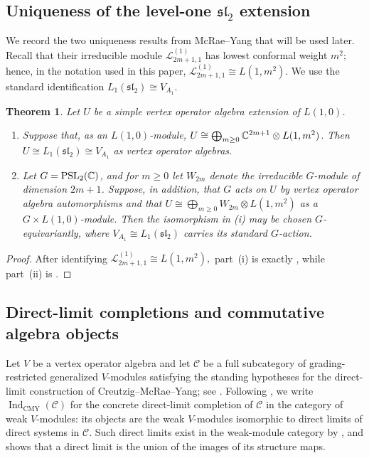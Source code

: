 \documentclass[10pt,a4paper]{amsart}
\numberwithin{equation}{section} \newtheorem{thm}{Theorem}[section] \newtheorem{lem}[thm]{Lemma} \newtheorem{ex}[thm]{Example} \newtheorem{prop}[thm]{Proposition} \newtheorem{cor}[thm]{Corollary} \newtheorem{defi}[thm]{Definition} \newtheorem{rmk}[thm]{Remark} \newtheorem{notation}[thm]{Notation}
\newcommand{\IndCMY}{\operatorname{Ind}_{\mathrm{CMY}}}
\newcommand{\PSLtwo}{\operatorname{PSL}_2(\C)}
\begin{document}
\subsection{Uniqueness of the level-one \texorpdfstring{$\mathfrak{sl}_2$}{sl2} extension}
\label{subsec:MY-L1-uniqueness}

We record the two uniqueness results from McRae--Yang \cite[Appendix~B]{MY} that will be used later. Recall that their irreducible module \(\mathcal L^{(1)}_{2m+1,1}\) has lowest conformal weight \(m^2\); hence, in the notation used in this paper, \(\mathcal L^{(1)}_{2m+1,1}\cong L(1,m^2).\) We use the standard identification \(L_1(\mathfrak{sl}_2)\cong V_{A_1}.\)
\begin{thm}
\label{thm:MY-L1-uniqueness}
Let \(U\) be a simple vertex operator algebra extension of \(L(1,0)\).
\begin{enumerate}[label=\textnormal{(\roman*)}]
\item
Suppose that, as an \(L(1,0)\)-module, \(U\cong\bigoplus_{m\ge0}\mathbb{C}^{2m+1}\otimes L(1,m^2)\). Then \(U\cong L_1(\mathfrak{sl}_2)\cong V_{A_1}\) as vertex operator algebras.

\item
Let \(G=\PSLtwo\), and for \(m\ge0\) let \(W_{2m}\) denote the irreducible \(G\)-module of dimension \(2m+1\). Suppose, in addition, that \(G\) acts on \(U\) by vertex operator algebra automorphisms and that \(U\cong\bigoplus_{m\ge0}W_{2m}\otimes L(1,m^2)\) as a \(G\times L(1,0)\)-module. Then the isomorphism in \textnormal{(i)} may be chosen \(G\)-equivariantly, where \(V_{A_1}\cong L_1(\mathfrak{sl}_2)\) carries its standard \(G\)-action.
\end{enumerate}
\end{thm}

\begin{proof}
After identifying \(\mathcal L^{(1)}_{2m+1,1}\cong L(1,m^2),\) part~\textnormal{(i)} is exactly \cite[Theorem~B.1]{MY}, while part~\textnormal{(ii)} is \cite[Theorem~B.2]{MY}.
\end{proof}

\subsection{Direct-limit completions and commutative algebra objects}

Let $V$ be a vertex operator algebra and let $\mathcal C$ be a full subcategory of grading-restricted generalized $V$-modules satisfying the standing hypotheses for the direct-limit construction of Creutzig--McRae--Yang; see \cite[Assumption~4.1]{CMY}. Following \cite[Definition~4.4]{CMY}, we write \(\IndCMY(\mathcal C)\) for the concrete direct-limit completion of $\mathcal C$ in the category of weak $V$-modules: its objects are the weak $V$-modules isomorphic to direct limits of direct systems in $\mathcal C$. Such direct limits exist in the weak-module category by \cite[Proposition~3.5]{CMY}, and \cite[Proposition~3.6]{CMY} shows that a direct limit is the union of the images of its structure maps.
\end{document}
